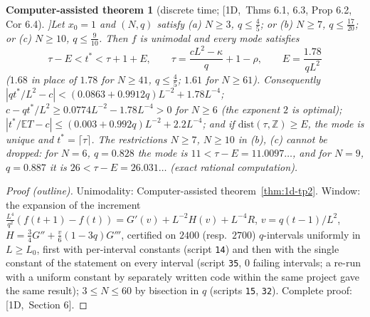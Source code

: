 \documentclass[10pt,a4paper]{article}
\theoremstyle{plain}
\newtheorem{catheorem}[theorem]{Computer-assisted theorem}
\theoremstyle{definition}
\newcommand{\src}[2]{[\textsf{#1},~#2]}           %
\newcommand{\ONE}{\textsf{1D}}
\newcommand{\E}{\mathbb{E}}
\newcommand{\Z}{\mathbb{Z}}
\begin{document}
\begin{catheorem}[discrete time; \src{\ONE}{Thms 6.1, 6.3, Prop 6.2, Cor 6.4}]\label{thm:1d-disc}
Let $x_0=1$ and $(N,q)$ satisfy (a) $N\ge3$, $q\le\frac45$; or (b) $N\ge7$, $q\le\frac{17}{20}$; or (c) $N\ge10$, $q\le\frac9{10}$. Then $f$ is unimodal and every mode satisfies
\[
\tau-E<t^*<\tau+1+E,\qquad \tau=\frac{cL^2-\kappa}q+1-\rho,\qquad E=\frac{1.78}{qL^2}
\]
($1.68$ in place of $1.78$ for $N\ge41$, $q\le\frac45$; $1.61$ for $N\ge61$). Consequently $|qt^*/L^2-c|<(0.0863+0.9912q)L^{-2}+1.78L^{-4}$; $c-qt^*/L^2\ge0.0774L^{-2}-1.78L^{-4}>0$ for $N\ge6$ (the exponent $2$ is optimal); $|t^*/\E T-c|\le(0.003+0.992q)L^{-2}+2.2L^{-4}$; and if $\mathrm{dist}(\tau,\Z)\ge E$, the mode is unique and $t^*=\lceil\tau\rceil$. The restrictions $N\ge7$, $N\ge10$ in (b), (c) cannot be dropped: for $N=6$, $q=0.828$ the mode is $11<\tau-E=11.0097\ldots$, and for $N=9$, $q=0.887$ it is $26<\tau-E=26.031\ldots$ (exact rational computation).
\end{catheorem}
\begin{proof}[Proof (outline)]
Unimodality: Computer-assisted theorem~\ref{thm:1d-tp2}. Window: the expansion of the increment $\frac{L^4}{q^2}(f(t+1)-f(t))=G'(v)+L^{-2}H(v)+L^{-4}R$, $v=q(t-1)/L^2$, $H=\frac34G''+\frac v6(1-3q)G'''$, certified on $2400$ (resp.\ $2700$) $q$-intervals uniformly in $L\ge L_0$, first with per-interval constants (script \texttt{14}) and then with the single constant of the statement on every interval (script \texttt{35}, $0$ failing intervals; a re-run with a uniform constant by separately written code within the same project gave the same result); $3\le N\le60$ by bisection in $q$ (scripts \texttt{15}, \texttt{32}). Complete proof: \src{\ONE}{Section 6}.
\end{proof}
\end{document}
